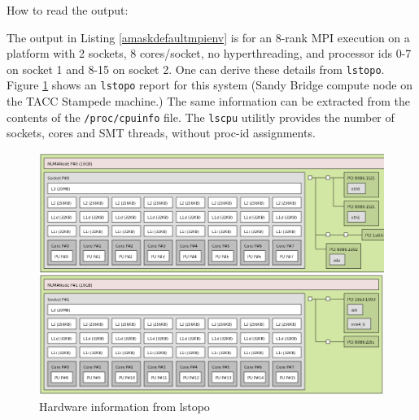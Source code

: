 \documentclass[10pt,a4paper]{report}
\begin{document}

How to read the output:

The output in Listing \ref{amaskdefaultmpienv} is for an 8-rank MPI execution on a 
platform with 2 sockets, 8 cores/socket, no hyperthreading, and processor ids 0-7 
on socket 1 and 8-15 on socket 2.  
One can derive these details from \verb+lstopo+.  
Figure \ref{fig:lstopo1} shows an \verb+lstopo+ report for this system (Sandy Bridge compute 
node on the TACC Stampede machine.)
The same information can be extracted from the contents of the \verb+/proc/cpuinfo+ file.
The \verb+lscpu+ utilitly provides the number of sockets, cores and SMT threads, without
proc-id assignments.

\begin{figure}[t]
\centering
\includegraphics[scale=0.34]{lstopo}
\caption{Hardware information from lstopo\label{fig:lstopo1}}
\end{figure}
\end{document}
